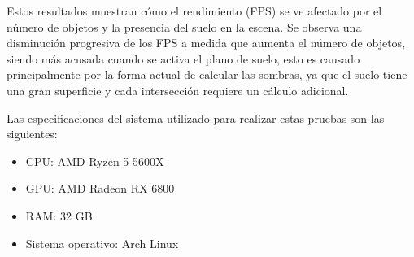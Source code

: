Estos resultados muestran cómo el rendimiento (FPS) se ve afectado por el número
de objetos y la presencia del suelo en la escena. Se observa una disminución
progresiva de los FPS a medida que aumenta el número de objetos, siendo más
acusada cuando se activa el plano de suelo, esto es causado principalmente por la forma actual de calcular las sombras,
ya que el suelo tiene una gran superficie y cada intersección requiere un cálculo adicional.

Las especificaciones del sistema utilizado para realizar estas pruebas son las siguientes:

\begin{itemize}
    \item CPU: AMD Ryzen 5 5600X
    \item GPU: AMD Radeon RX 6800
    \item RAM: 32 GB
    \item Sistema operativo: Arch Linux
\end{itemize}
